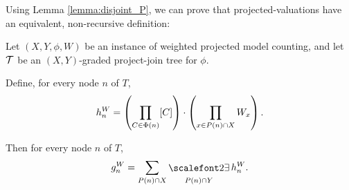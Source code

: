 Using Lemma \ref{lemma:disjoint_P}, we can prove that projected-valuations have an equivalent, non-recursive definition:
\begin{lemma}
\label{lemma:proj_valuation}
Let $(X, Y, \phi, W)$ be an instance of weighted projected model counting, and let $\mathcal{T}$ be an $(X,Y)$-graded project-join tree for $\phi$.

Define, for every node $n$ of $T$,
\begin{equation*}
    h^W_n = \left( \prod_{C \in \Phi(n)} [C] \right) \cdot \left( \prod_{x \in P(n) \cap X} W_x \right).
\end{equation*}

Then for every node $n$ of $T$,
\begin{equation}
\label{eqn:proj_valuation_lemma}
    g^W_n = \sum_{P(n) \cap X} \displaystyle\exist_{P(n) \cap Y} h^W_n.
\end{equation}
\end{lemma}
